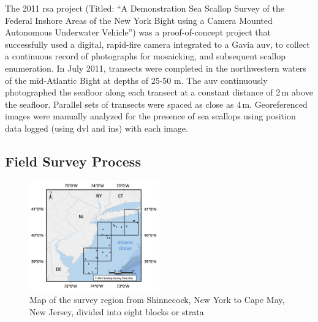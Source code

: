 \documentclass {udthesis}
\begin{document}
The 2011 \gls{rsa} 
project (Titled: ``A Demonstration Sea Scallop Survey of the 
Federal Inshore Areas of the New York Bight using a Camera Mounted Autonomous Underwater
 Vehicle'')
was a proof-of-concept project that successfully used a digital, rapid-fire camera integrated 
to a Gavia \gls{auv}, to collect a continuous record of photographs for mosaicking, 
and subsequent scallop enumeration. 
In July 2011, transects were completed in the northwestern waters of the mid-Atlantic 
Bight at depths of 25-50 m.  The \gls{auv} continuously photographed the 
seafloor along each transect at a constant distance of 2\,m above the seafloor.  
Parallel sets of transects were spaced as close as 4\,m.  
Georeferenced images were manually analyzed for the presence of sea scallops 
using position data logged (using \gls{dvl} and \gls{ins}) with each image.
%
\subsection{Field Survey Process}
%
\begin{figure}
\centering
\includegraphics[width=0.5\textwidth, natwidth=944, natheight=800]{survey_region}
\caption[Map of the scallop survey region]{Map of the survey region from Shinnecock, New York to Cape May, New Jersey, 
divided into eight blocks or strata}
\label{fig:strata}
\end{figure}
%
\end{document}
